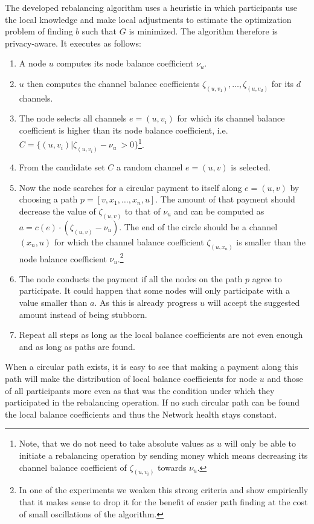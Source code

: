 \documentclass[conference]{IEEEtran}
\begin{document}
The developed rebalancing algorithm uses a heuristic in which participants use the local knowledge and make local adjustments to estimate the optimization problem of finding $b$ such that $G$ is minimized. The algorithm therefore is privacy-aware. 
It executes as follows:
\begin{enumerate}
\item A node $u$ computes its node balance coefficient $\nu_u$.
\item $u$ then computes the channel balance coefficients $\zeta_{(u,v_1)},\dots,\zeta_{(u,v_d)}$ for its $d$ channels.
\item The node selects all channels $e=(u,v_i)$ for which its channel balance coefficient is higher 
than its node balance coefficient, i.e.~$C = \{(u,v_i) | \zeta_{(u,v_i)} - \nu_u\ > 0\}$\footnote{
  Note, that we do not need to take absolute values as $u$ will only be able to initiate a rebalancing operation by sending money which means decreasing its channel balance coefficient of $\zeta_{(u,v_i)}$ towards $\nu_u$.}.
\item From the candidate set $C$ a random channel $e=(u,v)$ is selected.
\item Now the node searches for a circular payment to itself along $e=(u,v)$ by choosing a path $p = [v,x_1,\dots,x_n,u]$. The amount of that payment should decrease the value of $\zeta_{(u,v)}$ to that of $\nu_u$ and can be computed as $a = c(e)\cdot (\zeta_{(u,v)}-\nu_u)$. The end of the circle should be a channel $(x_n,u)$ for which the channel balance coefficient $\zeta_{(u,x_n)}$ is smaller than the node balance coefficient $\nu_u$.\footnote{In one of the experiments we weaken this strong criteria and show empirically that it makes sense to drop it for the benefit of easier path finding at the cost of small oscillations of the algorithm.}
\item The node conducts the payment if all the nodes on the path $p$ agree to participate. It could happen that some nodes will only participate with a value smaller than $a$. As this is already progress $u$ will accept the suggested amount instead of being stubborn. 
\item Repeat all steps as long as the local balance coefficients are not even enough and as long as paths are found.
\end{enumerate}

When a circular path exists, it is easy to see that making a payment along this path will make the distribution of local balance coefficients for node $u$ and those of all participants more even as that was the condition under which they participated in the rebalancing operation.
If no such circular path can be found the local balance coefficients and thus the Network health stays constant.
\end{document}
